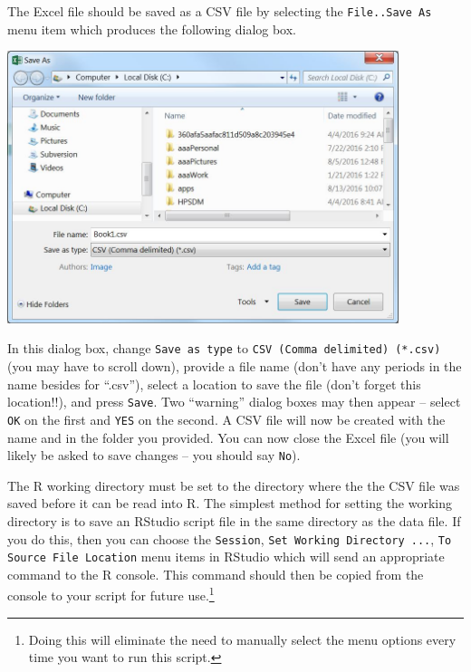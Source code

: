 \documentclass[10pt,openany]{book}\usepackage[]{graphicx}\usepackage[]{color}
\begin{document}

The Excel file should be saved as a CSV file by selecting the \verb"File..Save As" menu item which produces the following dialog box.
\begin{center}
  \includegraphics[width=4.5in]{Figs/Data_File_2.jpg}
\end{center}

In this dialog box, change \verb"Save as type" to \verb"CSV (Comma delimited) (*.csv)" (you may have to scroll down), provide a file name (don't have any periods in the name besides for ``.csv''), select a location to save the file (don't forget this location!!), and press \verb"Save".  Two ``warning'' dialog boxes may then appear -- select \verb"OK" on the first and \verb"YES" on the second.  A CSV file will now be created with the name and in the folder you provided.  You can now close the Excel file (you will likely be asked to save changes -- you should say \verb"No").

The R working directory must be set to the directory where the the CSV file was saved before it can be read into R.  The simplest method for setting the working directory is to save an RStudio script file in the same directory as the data file.  If you do this, then you can choose the \verb"Session", \verb"Set Working Directory ...", \verb"To Source File Location" menu items in RStudio which will send an appropriate  command to the R console.  This command should then be copied from the console to your script for future use.\footnote{Doing this will eliminate the need to manually select the menu options every time you want to run this script.}
\end{document}
